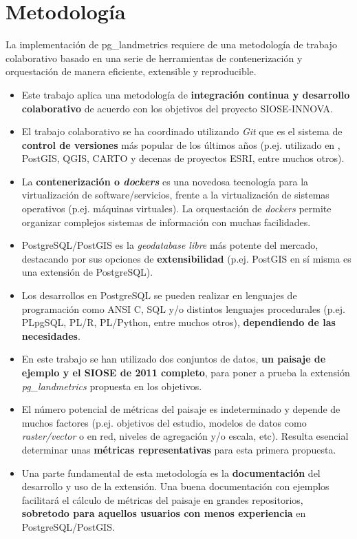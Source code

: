 

\chapter{Metodología}\label{chap:metod}

La implementación de pg\_landmetrics requiere de una metodología de trabajo colaborativo basado en una serie de herramientas de contenerización y orquestación de manera eficiente, extensible y reproducible.

\begin{graybox}
\begin{itemize}
\item Este trabajo aplica una metodología de \textbf{integración continua y desarrollo colaborativo} de acuerdo con los objetivos del proyecto SIOSE-INNOVA.
\item El trabajo colaborativo se ha coordinado utilizando \textit{Git} que es el sistema de \textbf{control de versiones} más popular de los últimos años (p.ej. utilizado en , PostGIS, QGIS, CARTO y decenas de proyectos ESRI, entre muchos otros).
\item La \textbf{contenerización o \textit{dockers}} es una novedosa tecnología para la virtualización de software/servicios, frente a la virtualización de sistemas operativos (p.ej. máquinas virtuales). La orquestación de \textit{dockers} permite organizar complejos sistemas de información con muchas facilidades.
\item PostgreSQL/PostGIS es la \textit{geodatabase libre} más potente del mercado, destacando por sus opciones de \textbf{extensibilidad} (p.ej. PostGIS en sí misma es una extensión de PostgreSQL).
\item Los desarrollos en PostgreSQL se pueden realizar en lenguajes de programación como ANSI C, SQL y/o distintos lenguajes procedurales (p.ej. PLpgSQL, PL/R, PL/Python, entre muchos otros), \textbf{dependiendo de las necesidades}.
\item En este trabajo se han utilizado dos conjuntos de datos, \textbf{un paisaje de ejemplo y el SIOSE de 2011 completo}, para poner a prueba la extensión \textit{pg\_landmetrics} propuesta en los objetivos.
\item El número potencial de métricas del paisaje es indeterminado y depende de muchos factores (p.ej. objetivos del estudio, modelos de datos como \textit{raster/vector} o en red, niveles de agregación y/o escala, etc). Resulta esencial determinar unas \textbf{métricas representativas} para esta primera propuesta.
\item Una parte fundamental de esta metodología es la \textbf{documentación} del desarrollo y uso de la extensión. Una buena documentación con ejemplos facilitará el cálculo de métricas del paisaje en grandes repositorios, \textbf{sobretodo para aquellos usuarios con menos experiencia} en PostgreSQL/PostGIS.
\end{itemize}
\end{graybox}


